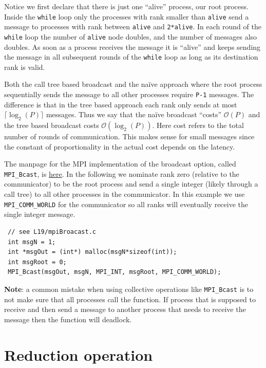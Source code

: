 Notice we first declare that there is just one ``alive'' process, our root process. Inside the \texttt{while} loop only the processes with rank smaller than \texttt{alive} send a message to processes with rank between \texttt{alive} and \texttt{2*alive}. In each round of the \texttt{while} loop the number of \texttt{alive} node doubles, and the number of messages also doubles. As soon as a process receives the message it is ``alive'' and keeps sending the message in all subsequent rounds of the \texttt{while} loop as long as its destination rank is valid.

Both the call tree based broadcast and the na\"{i}ve approach where the root process sequentially sends the message to all other processes require \texttt{P-1} messages. The difference is that in the tree based approach each rank only sends at most $\lceil\log_2(P)\rceil$ messages. Thus we say that the na\"{i}ve broadcast ``costs'' $\mathcal{O}(P)$ and the tree based broadcast costs $\mathcal{O}(\log_2(P))$. Here cost refers to the total number of rounds of communication. This makes sense for small messages since the constant of proportionality in the actual cost depends on the latency.

The manpage for the MPI implementation of the broadcast option, called \texttt{MPI\_Bcast}, is \href{https://www.mpich.org/static/docs/v3.1.x/www3/MPI_Bcast.html}{here}. In the following we nominate rank zero (relative to the communicator) to be the root process and send a single integer (likely through a call tree) to all other processes in the communicator. In this example we use \texttt{MPI\_COMM\_WORLD} for the communicator so all ranks will eventually receive the single integer message.

\begin{verbatim}
 // see L19/mpiBroacast.c
 int msgN = 1;
 int *msgOut = (int*) malloc(msgN*sizeof(int));
 int msgRoot = 0;
 MPI_Bcast(msgOut, msgN, MPI_INT, msgRoot, MPI_COMM_WORLD);
\end{verbatim}

{\bf Note}: a common mistake when using collective operations like \texttt{MPI\_Bcast} is to not make sure that all processes call the function. If process that is supposed to receive and then send a message to another process that needs to receive the message then the function will deadlock.

\section{Reduction operation}

